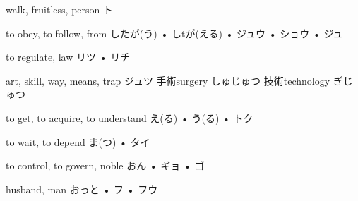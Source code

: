 



\setcounter{cardnum}{33}

		{walk, fruitless, person}
		{ト}
		{}{}
		{}{}
		{}{}
		{}{}
		{}{}

		{to obey, to follow, from}
		{したが(う) • しtが(える) • ジュウ • ショウ • ジュ}
		{}{}
		{}{}
		{}{}
		{}{}
		{}{}

		{to regulate, law}
		{リツ • リチ}
		{}{}
		{}{}
		{}{}
		{}{}
		{}{}

		{art, skill, way, means, trap}
		{ジュツ}
		{手術}{surgery しゅじゅつ}
		{技術}{technology ぎじゅつ}
		{}{}
		{}{}
		{}{}

		{to get, to acquire, to understand}
		{え(る) • う(る) • トク}
		{}{}
		{}{}
		{}{}
		{}{}
		{}{}

		{to wait, to depend}
		{ま(つ) • タイ}
		{}{}
		{}{}
		{}{}
		{}{}
		{}{}

		{to control, to govern, noble}
		{おん • ギョ • ゴ}
		{}{}
		{}{}
		{}{}
		{}{}
		{}{}

		{husband, man}
		{おっと • フ • フウ}
		{}{}
		{}{}
		{}{}
		{}{}
		{}{}

